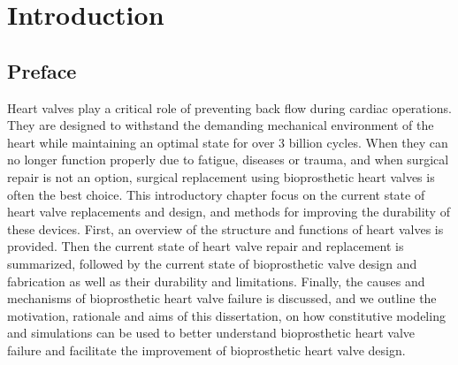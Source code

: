 \chapter{Introduction} %

\section*{Preface}
%

    Heart valves play a critical role of preventing back flow during cardiac operations. They are designed to withstand the demanding mechanical environment of the heart while maintaining an optimal state for over 3 billion cycles. When they can no longer function properly due to fatigue, diseases or trauma, and when surgical repair is not an option, surgical replacement using bioprosthetic heart valves is often the best choice. This introductory chapter focus on the current state of heart valve replacements and design, and methods for improving the durability of these devices. First, an overview of the structure and functions of heart valves is provided. Then the current state of heart valve repair and replacement is summarized, followed by the current state of bioprosthetic valve design and fabrication as well as their durability and limitations. Finally, the causes and mechanisms of bioprosthetic heart valve failure is discussed, and we outline the motivation, rationale and aims of this dissertation, on how constitutive modeling and simulations can be used to better understand bioprosthetic heart valve failure and facilitate the improvement of bioprosthetic heart valve design. 



















\newpage






